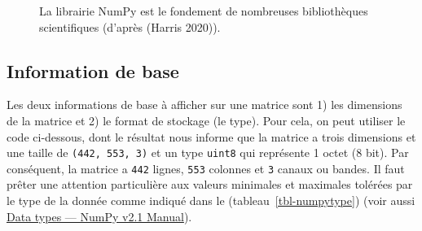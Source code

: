 \documentclass[
  11pt,
  letterpaper,
  open=any,
  twoside=false,
  french]{scrbook}
\begin{document}
\begin{figure}


\caption{\label{fig-naturenumpy1}La librairie NumPy est le fondement de
nombreuses bibliothèques scientifiques (d'après (Harris 2020)).}

\end{figure}%

\subsection{Information de base}\label{information-de-base}

Les deux informations de base à afficher sur une matrice sont 1) les
dimensions de la matrice et 2) le format de stockage (le type). Pour
cela, on peut utiliser le code ci-dessous, dont le résultat nous informe
que la matrice a trois dimensions et une taille de
\texttt{(442,\ 553,\ 3)} et un type \texttt{uint8} qui représente 1
octet (8 bit). Par conséquent, la matrice a \texttt{442} lignes,
\texttt{553} colonnes et \texttt{3} canaux ou bandes. Il faut prêter une
attention particulière aux valeurs minimales et maximales tolérées par
le type de la donnée comme indiqué dans le (tableau~\ref{tbl-numpytype})
(voir aussi
\href{https://numpy.org/doc/stable/user/basics.types.html}{Data types
--- NumPy v2.1 Manual}).
\end{document}
